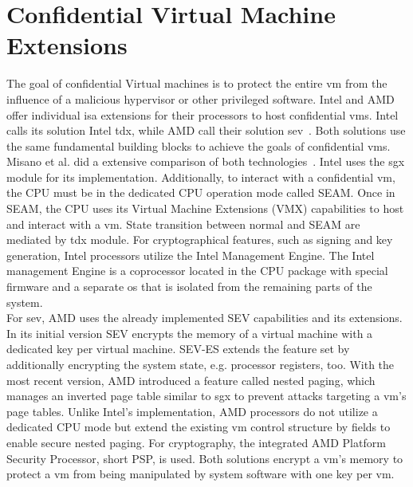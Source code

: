 \section{Confidential Virtual Machine Extensions}
\label{section:20:confidential_vms}
The goal of confidential Virtual machines is to protect the entire \gls{vm} from
the influence of a malicious hypervisor or other privileged software. Intel and
AMD offer individual \gls{isa} extensions for their processors to host
confidential \glspl{vm}. Intel calls its solution Intel \gls{tdx}, while AMD
call their solution \gls{sev}~\cite{tdx_whitepaper,kaplan_amd_2020}. Both
solutions use the same fundamental building blocks to achieve the goals of
confidential \glspl{vm}. Misano et al. did a extensive comparison of both
technologies~\cite{misono2024confidential}. Intel uses the \gls{sgx} module for
its implementation. Additionally, to interact with a confidential \gls{vm}, the
CPU must be in the dedicated CPU operation mode called SEAM. Once in SEAM, the
CPU uses its Virtual Machine Extensions (VMX) capabilities to host and interact
with a \gls{vm}. State transition between normal and SEAM are mediated by
\gls{tdx} module. For cryptographical features, such as signing and key
generation, Intel processors utilize the Intel Management Engine. The Intel
management Engine is a coprocessor located in the CPU package with special
firmware and a separate \gls{os} that is isolated from the remaining parts of
the system.\\

For \gls{sev}, AMD uses the already implemented SEV capabilities and its
extensions. In its initial version SEV encrypts the memory of a virtual machine
with a dedicated key per virtual machine. SEV-ES extends the feature set by
additionally encrypting the system state, e.g. processor registers, too. With
the most recent version, AMD introduced a feature called nested paging, which
manages an inverted page table similar to \gls{sgx} to prevent attacks targeting
a \gls{vm}'s page tables. Unlike Intel's implementation, AMD processors do not
utilize a dedicated CPU mode but extend the existing \gls{vm} control structure
by fields to enable secure nested paging. For cryptography, the integrated AMD
Platform Security Processor, short PSP, is used. Both solutions encrypt a
\gls{vm}'s memory to protect a \gls{vm} from being manipulated by system
software with one key per \gls{vm}.\\

